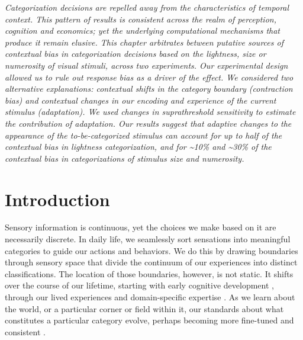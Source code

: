 \documentclass[a4paper, nobind]{templates/ociamthesis}
\begin{document}
\minitoc

\noindent 
\emph{Categorization decisions are repelled away from the characteristics of temporal context. This pattern of results is consistent across the realm of perception, cognition and economics; yet the underlying computational mechanisms that produce it remain elusive. This chapter arbitrates between putative sources of contextual bias in categorization decisions based on the lightness, size or numerosity of visual stimuli, across two experiments. Our experimental design allowed us to rule out response bias as a driver of the effect. We considered two alternative explanations: contextual shifts in the category boundary (contraction bias) and contextual changes in our encoding and experience of the current stimulus (adaptation). We used changes in suprathreshold sensitivity to estimate the contribution of adaptation. Our results suggest that adaptive changes to the appearance of the to-be-categorized stimulus can account for up to half of the contextual bias in lightness categorization, and for \textasciitilde10\% and \textasciitilde30\% of the contextual bias in categorizations of stimulus size and numerosity.}

\hypertarget{introduction-3}{%
\section{Introduction}\label{introduction-3}}

Sensory information is continuous, yet the choices we make based on it are necessarily discrete. In daily life, we seamlessly sort sensations into meaningful categories to guide our actions and behaviors. We do this by drawing boundaries through sensory space that divide the continuum of our experiences into distinct classifications. The location of those boundaries, however, is not static. It shifts over the course of our lifetime, starting with early cognitive development \autocite{gopnik1987,slawinski1998}, through our lived experiences \autocite{pollak2002} and domain-specific expertise \autocite{chi1981,shafto2003}. As we learn about the world, or a particular corner or field within it, our standards about what constitutes a particular category evolve, perhaps becoming more fine-tuned and consistent \autocite{slawinski1998,shafto2003}.
\end{document}

